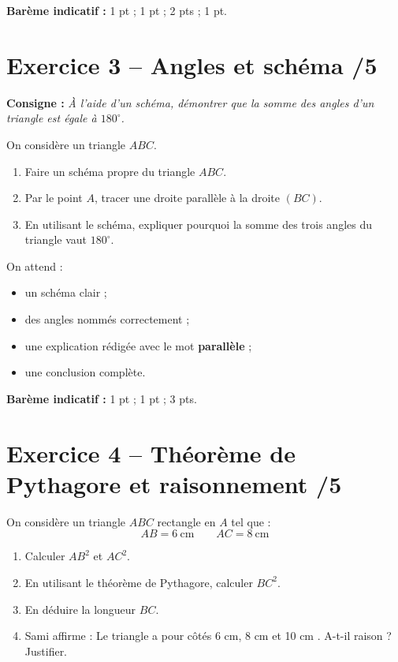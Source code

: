 \documentclass[11pt,a4paper]{article}
\begin{document}
\textbf{Barème indicatif :} 1 pt ; 1 pt ; 2 pts ; 1 pt.

\section*{Exercice 3 -- Angles et schéma \hfill /5}

\textbf{Consigne :} \emph{À l'aide d'un schéma, démontrer que la somme des angles d'un triangle est égale à \(180^\circ\).}

On considère un triangle \(ABC\).

\begin{enumerate}[label=\textbf{\arabic*.}, leftmargin=1.2cm]
    \item Faire un schéma propre du triangle \(ABC\).
    \item Par le point \(A\), tracer une droite parallèle à la droite \((BC)\).
    \item En utilisant le schéma, expliquer pourquoi la somme des trois angles du triangle vaut \(180^\circ\).
\end{enumerate}

\begin{tcolorbox}[title=Attendus]
On attend :
\begin{itemize}[leftmargin=1.2cm]
    \item un schéma clair ;
    \item des angles nommés correctement ;
    \item une explication rédigée avec le mot \textbf{parallèle} ;
    \item une conclusion complète.
\end{itemize}
\end{tcolorbox}

\textbf{Barème indicatif :} 1 pt ; 1 pt ; 3 pts.

\section*{Exercice 4 -- Théorème de Pythagore et raisonnement \hfill /5}

On considère un triangle \(ABC\) rectangle en \(A\) tel que :
\[
AB = 6\ \text{cm} \qquad AC = 8\ \text{cm}
\]

\begin{enumerate}[label=\textbf{\arabic*.}, leftmargin=1.2cm]
    \item Calculer \(AB^2\) et \(AC^2\).
    \item En utilisant le théorème de Pythagore, calculer \(BC^2\).
    \item En déduire la longueur \(BC\).
    \item Sami affirme : \og Le triangle a pour côtés 6 cm, 8 cm et 10 cm \fg. A-t-il raison ? Justifier.
\end{enumerate}
\end{document}
